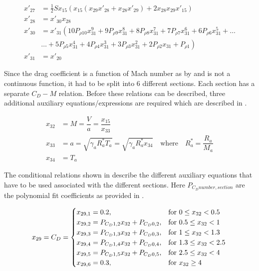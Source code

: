  \begin{equation} \label{eq:dragDerAux}
\begin{split}
x'_{27} &= \frac{1}{2}Sx_{15}\left(x_{15} \left(x_{29}x'_{28}+x_{28}x'_{29}\right)+2x_{28}x_{29}x'_{15}\right) \\
x'_{28} &= x'_{30}x_{28} \\
x'_{30} &=x'_{31} \left(10 P_{\rho 10}x_{31}^{9}+9 P_{\rho 9}x_{31}^{8}+8 P_{\rho 8}x_{31}^{7}+7 P_{\rho 7}x_{31}^{6}+6 P_{\rho 6}x_{31}^{5}+\dots \right. \\
&  \left. \dotsc +5 P_{\rho 5}x_{31}^{4}+4 P_{\rho 4}x_{31}^{3}+3 P_{\rho 3}x_{31}^{2}+2 P_{\rho 2}x_{31}+P_{\rho 1}\right) \\
x'_{31} &= x'_{20}
\end{split}
\end{equation}

Since the drag coefficient is a function of Mach number as by  and is not a continuous function, it had to be split into 6 different sections. Each section has a separate $C_{D}-M$ relation. Before these relations can be described, three additional auxiliary equations/expressions are required which are described in .

 \begin{equation} \label{eq:cdAux}
\begin{split}
x_{32} &= M = \dfrac{V}{a} = \dfrac{x_{15}}{x_{33}}\\
x_{33} &= a = \sqrt{\gamma_{a}R_{a}^{*}T_{a}} = \sqrt{\gamma_{a}R_{a}^{*}x_{34}} \quad \text{where} \quad R_{a}^{*}=\dfrac{R_{a}}{M_{a}} \\
x_{34} &= T_{a}
\end{split}
\end{equation}

The conditional relations shown in  describe the different auxiliary equations that have to be used associated with the different sections. Here $P_{C_{D} number,section}$ are the polynomial fit coefficients as provided in .

\begin{equation}\label{eq:cdCond}
x_{29}=C_{D}=\begin{cases}
x_{29,1}=0.2, & \text{for } 0\leq x_{32} < 0.5\\
x_{29,2}=P_{C_{D} 1,2}x_{32}+P_{C_{D} 0,2}, &  \text{for } 0.5\leq x_{32} < 1 \\
x_{29,3}=P_{C_{D} 1,3}x_{32}+P_{C_{D} 0,3}, &  \text{for } 1\leq x_{32} < 1.3 \\
x_{29,4}=P_{C_{D} 1,4}x_{32}+P_{C_{D} 0,4}, &  \text{for } 1.3\leq x_{32} < 2.5 \\
x_{29,5}=P_{C_{D} 1,5}x_{32}+P_{C_{D} 0,5}, &  \text{for } 2.5\leq x_{32} < 4 \\
x_{29,6}=0.3, &  \text{for } x_{32} \geq 4 
\end{cases}\\
\end{equation}

